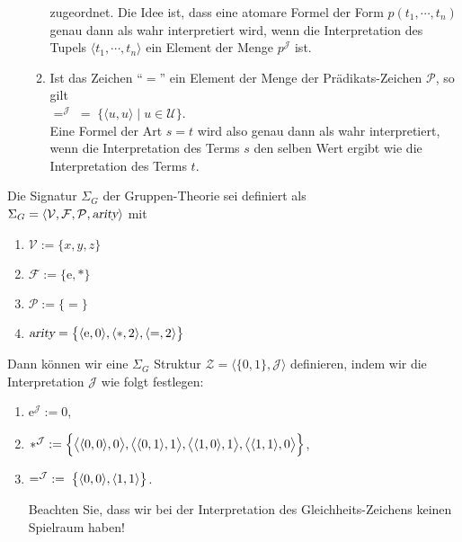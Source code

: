\begin{Definition}[Struktur]
\begin{enumerate}
\begin{enumerate}
              zugeordnet.  Die Idee ist, dass eine atomare Formel der Form $p(t_1, \cdots, t_n)$
              genau dann als wahr interpretiert wird, wenn die Interpretation des Tupels
              $\langle t_1, \cdots, t_n \rangle$ ein Element der Menge $p^\mathcal{J}$ ist.
        \item Ist das Zeichen ``$=$'' ein Element der Menge der Prädikats-Zeichen $\mathcal{P}$, so gilt
              \\[0.2cm]
              \hspace*{1.3cm}  
              $=^\mathcal{J} \;=\; \bigl\{ \langle u, u \rangle \mid u \in \mathcal{U} \bigr\}$.
              \\[0.2cm]
              Eine Formel der Art $s = t$ wird also genau dann als wahr interpretiert, 
              wenn die Interpretation des Terms $s$ den selben Wert ergibt wie die Interpretation des Terms $t$.
              \eox
        \end{enumerate}
    \end{enumerate}
\end{Definition}

\example
Die Signatur  $\Sigma_G$ der Gruppen-Theorie sei definiert als \\[0.2cm]
\hspace*{1.3cm} $\Sigma_G = \langle \mathcal{V}, \mathcal{F}, \mathcal{P},\textsl{arity}\rangle$ 
\quad mit
\begin{enumerate}
\item $\mathcal{V} := \{ x, y, z \}$
\item $\mathcal{F} := \{ \mathrm{e}, * \}$
\item $\mathcal{P} := \{ \mathtt{=} \}$
\item $\textsl{arity} = \bigl\{ \pair(\mathrm{e},0), \pair(*,2), \pair(\mathtt{=},2)\bigr\}$
\end{enumerate}
Dann können wir eine $\Sigma_G$ Struktur $\mathcal{Z} = \langle \{0,1\},\mathcal{J}\rangle$ definieren, 
indem wir die Interpretation $\mathcal{J}$ 
wie folgt festlegen:
\begin{enumerate}
\item $\mathrm{e}^\mathcal{J} := 0$,
\item $*^\mathcal{J} := \Bigl\{ \bigl\langle\pair(0,0), 0\bigr\rangle,
                                   \bigl\langle\pair(0,1), 1\bigr\rangle,
                                   \bigl\langle\pair(1,0), 1\bigr\rangle,
                                   \bigl\langle\pair(1,1), 0\bigr\rangle \Bigr\}$,
\item $=^\mathcal{J} \;:=\; \bigl\{ \pair(0,0), \pair(1,1) \bigr\}$.
                                 
      Beachten Sie, dass wir bei der Interpretation des Gleichheits-Zeichens 
      keinen Spielraum haben! \eox
\end{enumerate}

